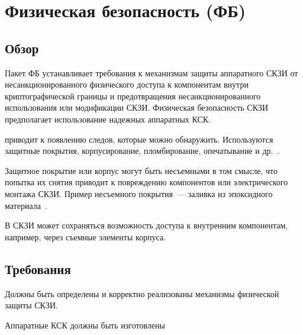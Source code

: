 \section{Физическая безопасность (ФБ)}\label{PS}

\subsection{Обзор}\label{PS.Intro}

Пакет ФБ устанавливает требования к механизмам защиты аппаратного СКЗИ 
от несанкционированного физического доступа к компонентам внутри 
криптографической границы и предотвращения несанкционированного использования 
или модификации СКЗИ.
%
Физическая безопасность СКЗИ предполагает использование надежных аппаратных 
КСК. 


приводит к появлению следов, которые можно обнаружить. Используются защитные 
покрытия, корпусирование, пломбирование, опечатывание и 
др.~.

Защитное покрытие или корпус могут быть несъемными в том смысле, что попытка их 
снятия приводит к повреждению компонентов или электрического монтажа СКЗИ. 
%
%
Пример несъемного покрытия~--- заливка из эпоксидного 
материала~. 
 
В СКЗИ может сохраняться возможность доступа к внутренним компонентам,
например, через съемные элементы корпуса. 

\subsection{Требования}\label{PS.Reqs}

\label{R.PS.List} %
Должны быть определены и корректно реализованы механизмы физической защиты СКЗИ. 

\label{R.PS.Production} %
Аппаратные КСК должны быть изготовлены 


